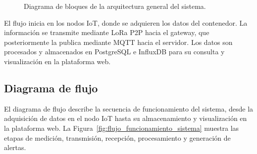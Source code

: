 \begin{figure}[H]
{
    }

    \caption{Diagrama de bloques de la arquitectura general del sistema.}
    \label{fig:diagrama_bloques_sistema}
\end{figure}

El flujo inicia en los nodos IoT, donde se adquieren los datos del contenedor. La información se transmite mediante LoRa P2P hacia el gateway, que posteriormente la publica mediante MQTT hacia el servidor. Los datos son procesados y almacenados en PostgreSQL e InfluxDB para su consulta y visualización en la plataforma web.

\subsection{Diagrama de flujo}

El diagrama de flujo describe la secuencia de funcionamiento del sistema, desde la adquisición de datos en el nodo IoT hasta su almacenamiento y visualización en la plataforma web. La Figura~\ref{fig:flujo_funcionamiento_sistema} muestra las etapas de medición, transmisión, recepción, procesamiento y generación de alertas.

